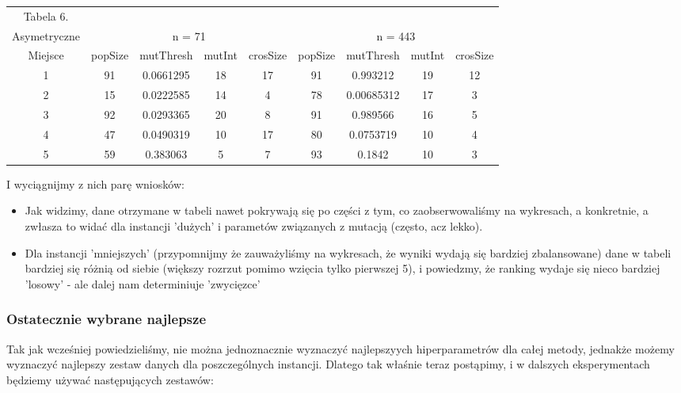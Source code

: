 \documentclass{article}
\begin{document}
\begin{table}[h!]
	\centering
	\begin{tabular}{c||c|c|c|c||c|c|c|c}
Tabela 6.\\
Asymetryczne & \multicolumn{4}{c}{n = 71} &\multicolumn{4}{c}{n = 443}\\
Miejsce & popSize & mutThresh & mutInt & crosSize & popSize & mutThresh & mutInt & crosSize \\
\hline
1 & 91 & 0.0661295 & 18 & 17 & 91 & 0.993212 & 19 & 12 \\
2 & 15 & 0.0222585 & 14 & 4 & 78 & 0.00685312 & 17 & 3 \\
3 & 92 & 0.0293365 & 20 & 8 & 91 & 0.989566 & 16 & 5 \\
4 & 47 & 0.0490319 & 10 & 17 & 80 & 0.0753719 & 10 & 4 \\
5 & 59 & 0.383063 & 5 & 7 & 93 & 0.1842 & 10 & 3 \\

	\end{tabular}
\end{table}

I wyciągnijmy z nich parę wniosków:
\begin{itemize}
	\item Jak widzimy, dane otrzymane w tabeli nawet pokrywają się po części z tym, co zaobserwowaliśmy na wykresach, a konkretnie, a zwłasza to widać dla instancji 'dużych' i parametów związanych z mutacją (często, acz lekko).
	\item Dla instancji 'mniejszych' (przypomnijmy że zauważyliśmy na wykresach, że wyniki wydają się bardziej zbalansowane) dane w tabeli bardziej się różnią od siebie (większy rozrzut pomimo wzięcia tylko pierwszej 5), i powiedzmy, że ranking wydaje się nieco bardziej 'losowy' - ale dalej nam determiniuje 'zwycięzce'
\end{itemize}

\subsubsection{Ostatecznie wybrane najlepsze}
Tak jak wcześniej powiedzieliśmy, nie można jednoznacznie wyznaczyć najlepszyych hiperparametrów dla całej metody, jednakże możemy wyznaczyć najlepszy zestaw danych dla poszczególnych instancji. Dlatego tak właśnie teraz postąpimy, i w dalszych eksperymentach będziemy używać następujących zestawów:
\end{document}
